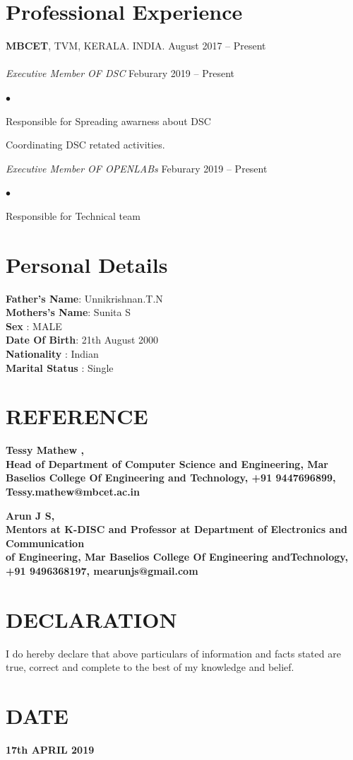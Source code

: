 \documentclass[margin,line]{res}
\newenvironment{list2}{
  \begin{list}{$\bullet$}{%
      \setlength{\itemsep}{0in}
      \setlength{\parsep}{0in} \setlength{\parskip}{0in}
      \setlength{\topsep}{0in} \setlength{\partopsep}{0in}
      \setlength{\leftmargin}{0.2in}}}{\end{list}}
\begin{document}
\begin{resume}
\begin{enumerate}
\end{enumerate}
\section{\sc Professional Experience}
{\bf MBCET}, TVM, KERALA. INDIA. \hfill{August 2017 -- Present}\\
\\

{\em Executive Member  OF DSC }\hfill {Feburary 2019 -- Present}\\
\begin{list2} %
	\item Responsible for Spreading awarness about DSC  \\
	\item Coordinating DSC retated activities.
\end{list2}
{\em Executive Member  OF OPENLABs }\hfill {Feburary 2019 -- Present}\\
\begin{list2} %
	\item Responsible for Technical team  \\
	
\end{list2}
\section{\sc Personal Details}
{\bf Father's Name}: Unnikrishnan.T.N \\
{\bf Mothers's Name}:  Sunita S\\
{\bf Sex}  :  MALE\\
{\bf Date Of Birth}:  21th August 2000\\
{\bf Nationality}       : Indian \\
{\bf Marital Status}       : Single \\



\section{\sc REFERENCE }

\bf Tessy Mathew ,\\ Head of Department of Computer Science and Engineering, Mar Baselios College Of Engineering and Technology, +91 9447696899, Tessy.mathew@mbcet.ac.in


\bf Arun J S,\\ Mentors at K-DISC and
Professor at Department of Electronics and Communication\\ of Engineering, Mar Baselios College Of Engineering andTechnology, +91 9496368197, mearunjs@gmail.com
\section{\sc DECLARATION}
I do hereby declare that above particulars of information and facts stated are true, correct and complete to the best of my knowledge and belief.
\section{\sc DATE}
\bf 17th APRIL 2019
\end{resume}
\end{document}
